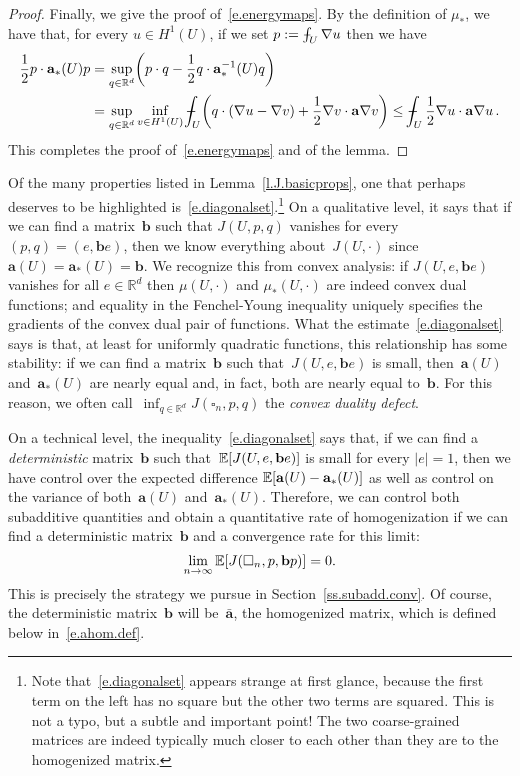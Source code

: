 \documentclass[11pt]{article} %
\let\oldsquare\square %
\renewcommand{\square}{\oldsquare}
\numberwithin{equation}{section}
\theoremstyle{definition}
\let\originalleft\left
\let\originalright\right
\renewcommand{\left}{\mathopen{}\mathclose\bgroup\originalleft}
\renewcommand{\right}{\aftergroup\egroup\originalright}
\newcommand*{\Rd}{\ensuremath{\mathbb{R}^d}}
\renewcommand{\b}{\ensuremath{\mathbf{b}}}
\renewcommand{\a}{\mathbf{a}}
\newcommand{\ahom}{\bar{\a}}
\newcommand{\cu}{\square}
\newcommand{\E}{\mathbb{E}}
\def\Xint#1{\mathchoice
{\XXint\displaystyle\textstyle{#1}}%
{\XXint\textstyle\scriptstyle{#1}}%
{\XXint\scriptstyle\scriptscriptstyle{#1}}%
{\XXint\scriptscriptstyle\scriptscriptstyle{#1}}%
\!\int}
\def\XXint#1#2#3{{\setbox0=\hbox{$#1{#2#3}{\int}$}
\vcenter{\hbox{$#2#3$}}\kern-.5\wd0}}
\def\fint{\Xint-}
\begin{document}
\begin{proof}
\smallskip

Finally, we give the proof of~\eqref{e.energymaps}.
By the definition of $\mu_*$, we have that, for every $u\in H^1(U)$, if we set $p:= \fint_U \nabla u$ then we have 
\begin{align*}
\frac12p \cdot \a_*(U) p
&
=
\sup_{q\in \Rd}
\biggl( p\cdot q - \frac12 q \cdot \a_*^{-1}(U) q \biggr)
\notag \\ & 
=
\sup_{q\in \Rd}
\inf_{v\in H^1(U)} 
\fint_U \biggl( q\cdot (\nabla u - \nabla v) + \frac12\nabla v \cdot \a\nabla v \biggr)
\leq 
\fint_U \frac 12\nabla u \cdot \a\nabla u
\,.
\end{align*}
This completes the proof of~\eqref{e.energymaps} and of the lemma. 
\end{proof}




Of the many properties listed in Lemma~\ref{l.J.basicprops}, one that perhaps deserves to be highlighted is~\eqref{e.diagonalset}.\footnote{Note that~\eqref{e.diagonalset} appears strange at first glance, because the first term on the left has no square but the other two terms are squared. This is not a typo, but a subtle and important point! The two coarse-grained matrices are indeed typically much closer to each other than they are to the homogenized matrix.} On a qualitative level, it says that if we can find a matrix~$\b$ such that $J(U,p,q)$ vanishes for every~$(p,q) = (e,\b e)$, then we know everything about~$J(U,\cdot)$ since~$\a(U) = \a_*(U) = \b$. We recognize this from convex analysis: if $J(U,e,\b e)$ vanishes for all $e\in\Rd$ then $\mu(U,\cdot)$ and $\mu_*(U,\cdot)$ are indeed convex dual functions; and equality in the Fenchel-Young inequality uniquely specifies the gradients of the convex dual pair of functions. What the estimate~\eqref{e.diagonalset} says is that, at least for uniformly quadratic functions, this relationship has some stability: if we can find a matrix~$\b$ such that~$J(U,e,\b e)$ is small, then~$\a(U)$ and~$\a_*(U)$ are nearly equal and, in fact, both are nearly equal to~$\b$. For this reason, we often call~$\inf_{q \in\Rd} J(\cu_n,p,q)$ the \emph{convex duality defect}.

\smallskip

On a technical level, the inequality~\eqref{e.diagonalset} says that, if we can find a \emph{deterministic} matrix~$\b$ such that~$\E\left[ J(U,e,\b e) \right]$ is small for every $|e|=1$, then we have control over the expected difference $\E \left[ \a(U) - \a_*(U) \right]$ as well as control on the variance of both~$\a(U)$ and~$\a_*(U)$. 
Therefore, we can control both subadditive quantities and obtain a quantitative rate of homogenization if we can find a deterministic matrix~$\b$ and a convergence rate for this limit: 
\begin{equation} 
\label{e.Jtozero}
\lim_{n\to\infty} \E \left[ J(\cu_n,p,\b p) \right] = 0. 
\end{equation}
This is precisely the strategy we pursue in Section~\ref{ss.subadd.conv}. Of course, the deterministic matrix~$\b$ will be~$\ahom$, the homogenized matrix, which is defined below in~\eqref{e.ahom.def}. 
\end{document}
